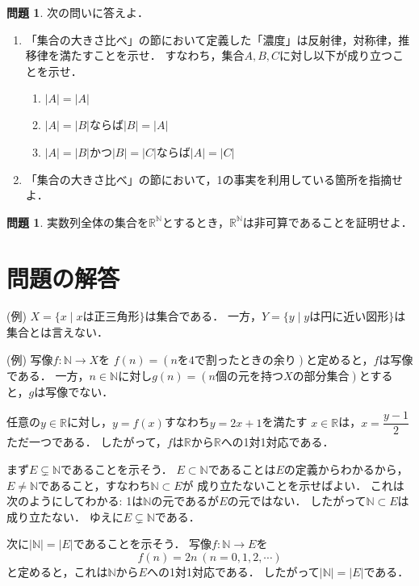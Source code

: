 ﻿\documentclass[./main]{subfiles} %
\theoremstyle{definition}
\newtheorem{hamadaqst}[hamadadefi]{問題}
\begin{document}
\begin{hamadaqst}
\label{cardiseq}
次の問いに答えよ．
\begin{enumerate}
\item 「集合の大きさ比べ」の節において定義した「濃度」は反射律，対称律，推移律を満たすことを示せ．
すなわち，集合$A,B,C$に対し以下が成り立つことを示せ．
\begin{enumerate}
\item $|A|=|A|$
\item $|A|=|B|$ならば$|B|=|A|$
\item $|A|=|B|$かつ$|B|=|C|$ならば$|A|=|C|$
\end{enumerate}
\item 「集合の大きさ比べ」の節において，1の事実を利用している箇所を指摘せよ．
\end{enumerate}
\end{hamadaqst}

\begin{hamadaqst}
\label{cantorpractice}
実数列全体の集合を$\mathbb{R}^\mathbb{N}$とするとき，$\mathbb{R}^\mathbb{N}$は非可算であることを証明せよ．
\end{hamadaqst}

\section{問題の解答}
(例)
$X=\{x\mid xは正三角形\}$は集合である．
一方，$Y=\{y\mid yは円に近い図形\}$は集合とは言えない．

(例)
写像$f\colon\mathbb{N}\to X$を
$f(n)=(nを4で割ったときの余り)$と定めると，$f$は写像である．
一方，$n\in\mathbb{N}$に対し$g(n)=(n個の元を持つXの部分集合)$とすると，$g$は写像でない．

任意の$y\in\mathbb{R}$に対し，$y=f(x)$すなわち$y=2x+1$を満たす
$x\in\mathbb{R}$は，$x=\dfrac{y-1}{2}$ただ一つである．
したがって，$f$は$\mathbb{R}$から$\mathbb{R}$への1対1対応である．

まず$E\subsetneq\mathbb{N}$であることを示そう．
$E\subset\mathbb{N}$であることは$E$の定義からわかるから，
$E\neq\mathbb{N}$であること，すなわち$\mathbb{N}\subset E$が
成り立たないことを示せばよい．
これは次のようにしてわかる:
1は$\mathbb{N}$の元であるが$E$の元ではない．
したがって$\mathbb{N}\subset E$は成り立たない．
ゆえに$E\subsetneq\mathbb{N}$である．

次に$|\mathbb{N}|=|E|$であることを示そう．
写像$f\colon\mathbb{N}\to E$を
\[
f(n)=2n\ (n=0,1,2,\cdots)
\]
と定めると，これは$\mathbb{N}$から$E$への1対1対応である．
したがって$|\mathbb{N}|=|E|$である．
\end{document}
